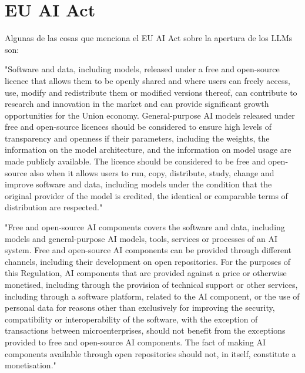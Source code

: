 \section{EU AI Act}

Algunas de las cosas que menciona el EU AI Act \cite{EU2024_1689} sobre la apertura de los LLMs son:


"Software and data, including models, released under a free and open-source licence that allows them to be openly shared and where users can freely access, use, modify and redistribute them or modified versions thereof, can contribute to research and innovation in the market and can provide significant growth opportunities for the Union economy. General-purpose AI models released under free and open-source licences should be considered to ensure high levels of transparency and openness if their parameters, including the weights, the information on the model architecture, and the information on model usage are made publicly available. The licence should be considered to be free and open-source also when it allows users to run, copy, distribute, study, change and improve software and data, including models under the condition that the original provider of the model is credited, the identical or comparable terms of distribution are respected." 

"Free and open-source AI components covers the software and data, including models and general-purpose AI models, tools, services or processes of an AI system. Free and open-source AI components can be provided through different channels, including their development on open repositories. For the purposes of this Regulation, AI components that are provided against a price or otherwise monetised, including through the provision of technical support or other services, including through a software platform, related to the AI component, or the use of personal data for reasons other than exclusively for improving the security, compatibility or interoperability of the software, with the exception of transactions between microenterprises, should not benefit from the exceptions provided to free and open-source AI components. The fact of making AI components available through open repositories should not, in itself, constitute a monetisation." 

